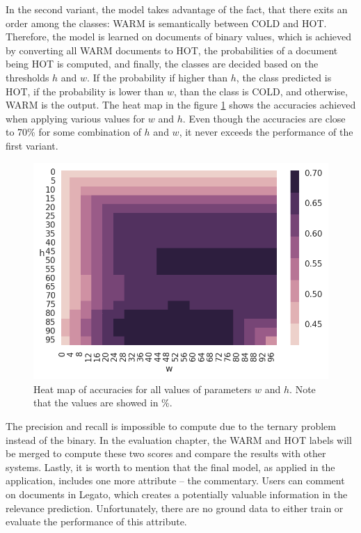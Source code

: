 \documentclass[
  digital, %
  notable,   %
  nolof,     %
  nolot,     %
]{fithesis3}
\begin{document}
In the second variant, the model takes advantage of the fact, that there exits an order among the classes: WARM is semantically between COLD and HOT.
Therefore, the model is learned on documents of binary values, which is achieved by converting all WARM documents to HOT, the probabilities of a document being HOT is computed, and finally, the classes are decided based on the thresholds $h$ and $w$.
If the probability if higher than $h$, the class predicted is HOT, if the probability is lower than $w$, than the class is COLD, and otherwise, WARM is the output.
The heat map in the figure \ref{fig:doc_two_class} shows the accuracies achieved when applying various values for $w$ and $h$.
Even though the accuracies are close to 70\% for some combination of $h$ and $w$, it never exceeds the performance of the first variant.

\begin{figure}[H]
\caption{Heat map of accuracies for all values of parameters $w$ and $h$. Note that the values are showed in \%.}
\label{fig:doc_two_class}
\includegraphics[width=\textwidth]{img/doc_two_class}
\end{figure}

The precision and recall is impossible to compute due to the ternary problem instead of the binary. In the evaluation chapter, the WARM and HOT labels will be merged to compute these two scores and compare the results with other systems.
Lastly, it is worth to mention that the final model, as applied in the application, includes one more attribute -- the commentary.
Users can comment on documents in Legato, which creates a potentially valuable information in the relevance prediction.
Unfortunately, there are no ground data to either train or evaluate the performance of this attribute.
\end{document}
